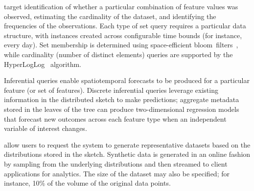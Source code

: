 \begin{description}[leftmargin=*]
    \item[Set Queries] target identification of whether a particular combination of feature values was observed, estimating the cardinality of the dataset, and identifying the frequencies of the observations. Each type of set query requires a particular data structure, with instances created across configurable time bounds (for instance, every day). Set membership is determined using space-efficient bloom~filters~\cite{bloom1970space}, while cardinality (number of distinct elements) queries are supported by the HyperLogLog~\cite{flajolet2007hyperloglog} algorithm.


\item[Inferential Queries]
    Inferential queries enable spatiotemporal forecasts to be produced for a particular feature (or set of features). Discrete inferential queries leverage existing information in the distributed sketch to make predictions; aggregate metadata stored in the leaves of the tree can produce two-dimensional regression models that forecast new outcomes across each feature type when an independent variable of interest changes.


\item[Synthetic Data Queries] allow users to request the system to generate representative datasets based on the distributions stored in the sketch. Synthetic data is generated in an online fashion by sampling from the underlying distributions and then streamed to client applications for analytics. The size of the dataset may also be specified; for instance, 10\% of the volume of the original data points.
\end{description}

